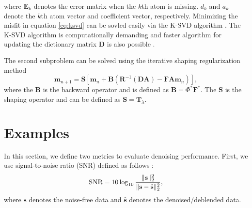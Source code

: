 where $\mathbf{E}_k$ denotes the error matrix when the $k$th atom is missing. $d_k$ and $a_k$ denote the $k$th atom vector and coefficient vector, respectively. Minimizing the misfit in equation \ref{eq:ksvd} can be sovled easily via the K-SVD algorithm \cite[]{aksvd2008,shaohuan2019ieee}. The K-SVD algorithm is computationally demanding and faster algorithm for updating the dictionary matrix $\mathbf{D}$ is also possible \cite[]{yangkang2017sgk}.

The second subproblem can be solved using the iterative shaping regularization method
	\begin{equation}
	\mathbf{m}_{n+1}=\mathbf{S}\left[\mathbf{m}_n+\mathbf{B}\left(\mathbf{R}^{-1}\left(\mathbf{D}\mathbf{A}\right)-\mathbf{F}\mathbf{A}\mathbf{m}_n\right)\right],
	\label{eq:shape}
	\end{equation}
where the $\mathbf{B}$ is the backward operator and is defined as $\mathbf{B}=\Phi^*\mathbf{F}^*$.  The $\mathbf{S}$ is the shaping operator and can be defined as $\mathbf{S}=\mathbf{T}_\lambda$. 

\section{Examples}
In this section, we define two metrics to evaluate denoising performance. First, we use signal-to-noise ratio (SNR) defined as follows \cite[]{weilin2016seg,weilin2016seg2,wujuan2018jge1,wujuan2018jge2,chenwei2018,shaohuan20183d}:
\begin{equation}
\label{eq:snr}
\text{SNR}=10\log_{10}\frac{\Arrowvert \mathbf{s} \Arrowvert_2^2}{\Arrowvert \mathbf{s} -\hat{\mathbf{s}}\Arrowvert_2^2},
\end{equation}
where $\mathbf{s}$ denotes the noise-free data and $\hat{\mathbf{s}}$ denotes the denoised/deblended data. 

